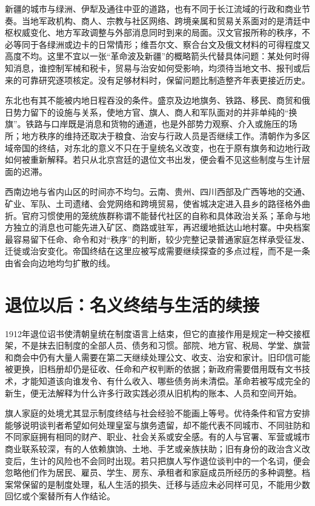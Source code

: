 新疆的城市与绿洲、伊犁及通往中亚的道路，也有不同于长江流域的行政和商业节奏。当地军政机构、商人、宗教与社区网络、跨境亲属和贸易关系面对的是清廷中枢权威变化、地方军政调整与外部消息同时到来的局面。汉文官报所称的秩序，不必等同于各绿洲或边卡的日常情形；维吾尔文、察合台文及俄文材料的可得程度又高度不均。这里不宜以一张“革命波及新疆”的概略箭头代替具体问题：某处何时得知消息，谁控制军械和税卡，贸易与治安如何受影响，均须待当地文书、报刊或后来的可靠研究逐项核定。没有足够材料时，保留问题比制造整齐年表更接近历史。

东北也有其不能被内地日程吞没的条件。盛京及边地旗务、铁路、移民、商贸和俄日势力留下的设施与关系，使地方官、旗人、商人和军队面对的并非单纯的“换旗”。铁路与口岸既是消息和货物的通道，也是外部势力观察、介入或施压的场所；地方秩序的维持还取决于粮食、治安与行政人员是否继续工作。清朝作为多区域帝国的终结，对东北的意义不只在于皇统名义改变，也在于原有旗务和边地行政如何被重新解释。若只从北京宫廷的退位文书出发，便会看不见这些制度与生计层面的迟滞。

西南边地与省内山区的时间亦不均匀。云南、贵州、四川西部及广西等地的交通、矿业、军队、土司遗绪、会党网络和跨境贸易，使省城决定进入县乡的路径格外曲折。官府习惯使用的笼统族群称谓不能替代社区的自称和具体政治关系；革命与地方独立的消息也可能先进入矿区、商路或驻军，再迟缓地抵达山地村寨。中央档案最容易留下任命、命令和对“秩序”的判断，较少完整记录普通家庭怎样承受征发、迁徙或治安变化。帝国终结在这里应被写成需要继续探查的多点过程，而不是一条由省会向边地均匀扩散的线。

\section{退位以后：名义终结与生活的续接}

1912年退位诏书使清朝皇统在制度语言上结束，但它的直接作用是规定一种交接框架，不是抹去旧制度的全部人员、债务和习惯。部院、地方官、税局、学堂、旗营和商会中仍有大量人需要在第二天继续处理公文、收支、治安和家计。旧印信可能被更换，旧档册却仍是征收、任命和产权判断的依据；新政府需要借用既有文书技术，才能知道该向谁发令、有什么收入、哪些债务尚未清偿。革命若被写成完全的新生，便无法解释为什么许多行政实践必须从旧机构的账本、人员和空间开始。

旗人家庭的处境尤其显示制度终结与社会经验不能画上等号。优待条件和官方安排能够说明谈判者希望如何处理皇室与旗务遗留，却不能代表不同城市、不同驻防和不同家庭拥有相同的财产、职业、社会关系或安全感。有的人与官署、军营或城市商业联系较深，有的人依赖旗饷、土地、手艺或亲族扶助；旧有身份的政治含义改变后，生计的风险也不会同时出现。若只把旗人写作退位谈判中的一个名词，便会忽略他们作为居民、雇员、学生、房东、承租者和家庭成员所经历的多种调整。档案常保留的是制度处理，私人生活的损失、迁移与适应未必同样可见，不能用少数回忆或个案替所有人作结论。

